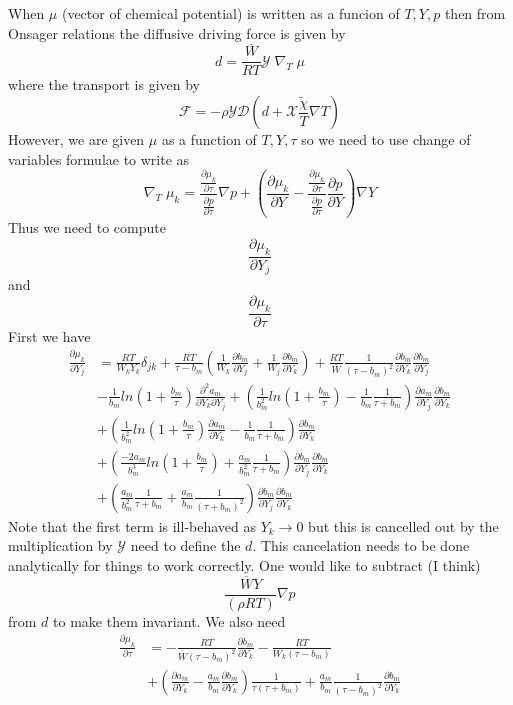 \documentclass[11pt]{article}
\newcommand{\SpeciesFlux}{\boldsymbol{\mathcal{F}}}
\newcommand{\wbar}{\overline{W}}
\begin{document}
When $\mu$ (vector of chemical potential) is written as a funcion of $T,Y,p$ then
from Onsager relations
the diffusive driving force is given by
\[
d = \frac{\wbar}{RT} \mathcal{Y} \; \nabla_T \; \mu
\]
where the transport is given by
\[
\SpeciesFlux = - \rho \mathcal{Y} \mathcal{D} ( d + \mathcal{X} \frac{ \tilde{\chi}}{T} \nabla T )
\]
However, we are given $\mu$ as a function of $T,Y,\tau$ so we need to use change of variables formulae
to write as
\[
\nabla_T \; \mu_k = 
\frac{\frac{\partial \mu_k}{\partial \tau}}
{\frac{\partial p}{\partial \tau}} \nabla p
+
\left (
\frac{\partial \mu_k}{\partial Y} -
\frac{\frac{\partial \mu_k}{\partial \tau}}
{\frac{\partial p}{\partial \tau}} 
\frac{\partial p}{\partial Y} 
\right ) \nabla Y
\]
Thus we need to compute
\[
\frac{\partial \mu_k}{\partial Y_j}
\]
and
\[
\frac{\partial \mu_k}{\partial \tau}
\]
First we have
\begin{align}
\frac{\partial \mu_k}{\partial Y_j} &=  \frac{RT}{W_k Y_k} \delta_{jk} + \frac{RT}{\tau-b_m} \left(
\frac{1}{W_k} \frac{\partial b_m}{\partial Y_j}+\frac{1}{W_j} \frac{\partial b_m}{\partial Y_k} \right )
+ \frac{RT}{\wbar} \frac{1} {(\tau - b_m)^2} \frac{\partial b_m}{\partial Y_k} \frac{\partial b_m}{\partial Y_j}  \nonumber \\
&- \frac{1}{b_m} ln ( 1 + \frac{b_m}{\tau} ) \frac{\partial^2 a_m }{\partial Y_k \partial Y_j}
+ \left ( \frac{1}{b_m^2} ln ( 1 + \frac{b_m}{\tau} ) - \frac{1}{b_m} \frac{1}{\tau+b_m}  \right)
\frac{\partial a_m }{ \partial Y_j}
\frac{\partial b_m }{\partial Y_k }
\nonumber \\
&+\left( \frac{1}{b_m^2} ln ( 1 + \frac{b_m}{\tau} ) \frac{\partial a_m}{\partial Y_k} - \frac{1}{b_m} \frac{1}{\tau+b_m} \right )
\frac{\partial b_m }{\partial Y_k } \nonumber \\
&+ \left( \frac{-2 a_m}{b_m^3} ln ( 1 + \frac{b_m}{\tau} ) + \frac{a_m}{b_m^2} \frac{1}{\tau+b_m} \right )
\frac{\partial b_m }{\partial Y_j } \frac{\partial b_m }{\partial Y_k } \nonumber \\
&+ \left( \frac{ a_m}{b_m^2} \frac{1}{\tau+b_m} + \frac{a_m}{b_m} \frac{1}{(\tau+b_m)^2} \right )
\frac{\partial b_m }{\partial Y_j } \frac{\partial b_m }{\partial Y_k }
\end{align}
Note that the first term is ill-behaved as $Y_k \rightarrow 0$ but this is cancelled out by the multiplication by
$\mathcal{Y}$ need to define the $d$.  This cancelation needs to be done analytically for things to work correctly.
One would like to subtract (I think)
\[
\frac{\wbar Y} { (\rho R T)} \nabla p
\]
from $d$ to make them invariant.  
We also need
\begin{align}
\frac{\partial \mu_k}{\partial \tau} &=  
-\frac{RT}{\wbar (\tau-b_m)^2} \frac{\partial b_m}{\partial Y_k}
-\frac{RT}{W_k (\tau-b_m)} \nonumber \\
&+ \left( \frac{\partial a_m}{\partial Y_k} - \frac{a_m}{b_m} \frac{\partial b_m}{\partial Y_k} \right )
\frac{1}{\tau ( \tau+b_m)}
+ \frac{a_m}{b_m} \frac{1}{(\tau - b_m)^2} \frac{\partial b_m}{\partial Y_k}
\end{align}
\end{document}

